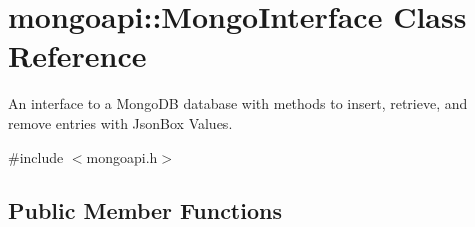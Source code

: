\hypertarget{classmongoapi_1_1MongoInterface}{}\section{mongoapi\+:\+:Mongo\+Interface Class Reference}
\label{classmongoapi_1_1MongoInterface}


An interface to a Mongo\+DB database with methods to insert, retrieve, and remove entries with Json\+Box Values.  




{\ttfamily \#include $<$mongoapi.\+h$>$}

\subsection*{Public Member Functions}
